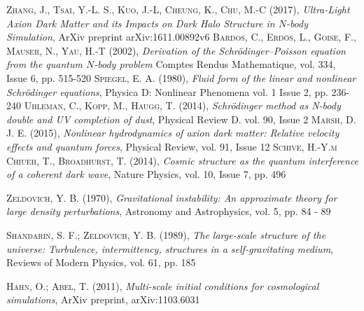 \documentclass[a4paper,openright,12pt]{book}
\begin{document}
\begin{thebibliography}{a}
 \textsc{Zhang, J., Tsai, Y.-L. S., Kuo, J.-L, Cheung, K., Chu, M.-C (2017)},
\textit{Ultra-Light Axion Dark Matter and its Impacts on Dark Halo Structure in $N$-body Simulation},
ArXiv preprint  arXiv:1611.00892v6
 \textsc{Bardos, C., Erdös, L., Goise, F., Mauser, N., Yau, H.-T (2002)},
\textit{Derivation of the Schrödinger–Poisson equation from the quantum
$N$-body problem}
Comptes Rendus Mathematique, vol. 334, Issue 6, pp. 515-520
 \textsc{Spiegel, E. A. (1980)},
\textit{Fluid form of the linear and nonlinear Schrödinger equations},
Physica D: Nonlinear Phenomena vol. 1 Issue 2, pp. 236-240 
 \textsc{Uhleman, C., Kopp, M., Haugg, T. (2014)},
\textit{Schrödinger method as N-body double and UV completion of dust},
Physical Review D. vol. 90, Issue 2 
\textsc{Marsh, D. J. E. (2015)},
\textit{Nonlinear hydrodynamics of axion dark matter: Relative velocity effects and quantum forces},
Physical Review, vol. 91, Issue 12
 \textsc{Schive, H.-Y.m Chiueh, T., Broadhurst, T. (2014)},
\textit{Cosmic structure as the quantum interference of a coherent dark wave},
Nature Physics, vol. 10, Issue 7, pp. 496

 \textsc{Zeldovich, Y. B. (1970)},
\textit{Gravitational instability: An approximate theory for large density perturbations},
Astronomy and Astrophysics, vol. 5, pp. 84 - 89

 \textsc{Shandarin, S. F.; Zeldovich, Y. B. (1989)},
\textit{The large-scale structure of the universe: Turbulence, intermittency, structures in a self-gravitating medium},
Reviews of Modern Physics, vol. 61, pp. 185

 \textsc{Hahn, O.; Abel, T. (2011)},
\textit{Multi-scale initial conditions for cosmological simulations},
ArXiv preprint, arXiv:1103.6031
 
\end{thebibliography}
\end{document}
